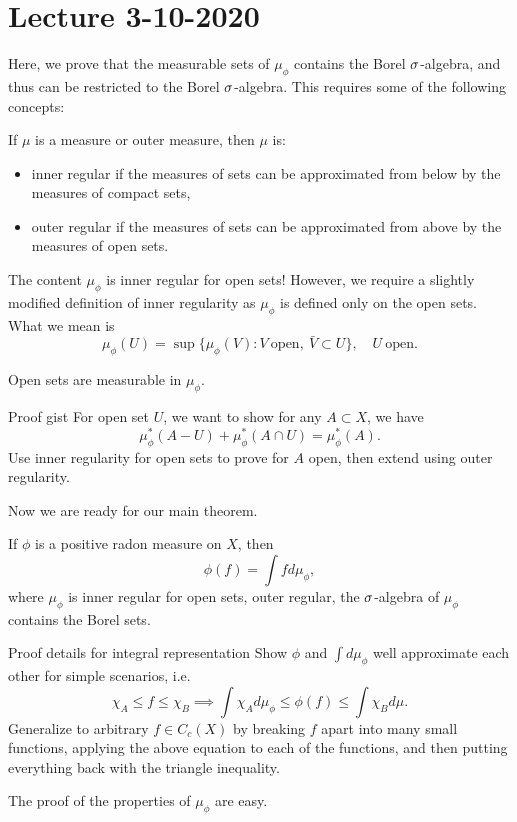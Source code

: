 \section{Lecture 3-10-2020}
Here, we prove that the measurable sets of $\mu_\phi$ contains the Borel $\sigma$-algebra, and thus can be restricted to the Borel $\sigma$-algebra. This requires some of the following concepts:
\begin{dfn}
If $\mu$ is a measure or outer measure, then $\mu$ is:
\begin{itemize}
    \item inner regular if the measures of sets can be approximated from below by the measures of compact sets,
    \item outer regular if the measures of sets can be approximated from above by the measures of open sets.
\end{itemize}
\end{dfn}
The content $\mu_\phi$ is inner regular for open sets! However, we require a slightly modified definition of inner regularity as $\mu_\phi$ is defined only on the open sets. What we mean is
\[
    \mu_\phi(U) = \sup\{\mu_\phi(V): V \ \text{open}, \ \bar{V} \subset U\}, \quad U \ \text{open.}
\]

\begin{thm}
Open sets are measurable in $\mu_\phi$.
\end{thm}

\begin{details}{Proof gist}
For open set $U$, we want to show for any $A \subset X$, we have
\[
    \mu_\phi^*(A - U) + \mu_\phi^*(A \cap U) = \mu_\phi^*(A).
\]
Use inner regularity for open sets to prove for $A$ open, then extend using outer regularity.
\end{details}

Now we are ready for our main theorem.

\begin{thm}
If $\phi$ is a positive radon measure on $X$, then
\[
    \phi(f) = \int f d\mu_\phi,
\]
where $\mu_\phi$ is inner regular for open sets, outer regular, the $\sigma$-algebra of $\mu_\phi$ contains the Borel sets.
\end{thm}
\begin{details}{Proof details for integral representation}
    Show $\phi$ and $\int d\mu_\phi$ well approximate each other for simple scenarios, i.e.
\[
    \chi_A \leq f \leq \chi_B \implies \int \chi_A d\mu_\phi \leq \phi(f) \leq \int \chi_B d\mu.
\]
Generalize to arbitrary $f \in C_c(X)$ by breaking $f$ apart into many small functions, applying the above equation to each of the functions, and then putting everything back with the triangle inequality.
\end{details}
The proof of the properties of $\mu_\phi$ are easy.
